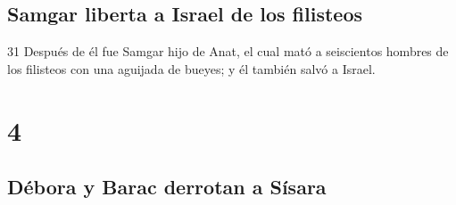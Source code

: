 \section*{Samgar liberta a Israel de los filisteos}

31 Después de él fue Samgar hijo de Anat, el cual mató a seiscientos hombres de los filisteos con una aguijada de bueyes; y él también salvó a Israel.

\chapter{4}

\section*{Débora y Barac derrotan a Sísara}

